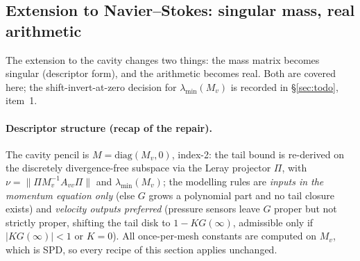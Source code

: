 \documentclass[11pt,a4paper]{article}
\begin{document}
{\subsection{Extension to Navier--Stokes: singular mass, real arithmetic}
\label{sec:ns}


The extension to the cavity changes two things: the mass matrix becomes singular
(descriptor form), and the arithmetic becomes real.  Both are covered here; the
shift-invert-at-zero decision for $\lambda_{\min}(M_v)$ is recorded in \S\ref{sec:todo},
item~1.

\paragraph{Descriptor structure (recap of the repair).}  The cavity pencil is
$M=\mathrm{diag}(M_v,0)$, index-2: the tail bound is re-derived on the discretely
divergence-free subspace via the Leray projector $\Pi$, with
$\nu=\|\Pi M_v^{-1}A_{vv}\Pi\|$ and $\lambda_{\min}(M_v)$; the modelling rules are
\emph{inputs in the momentum equation only} (else $G$ grows a polynomial part and no
tail closure exists) and \emph{velocity outputs preferred} (pressure sensors leave $G$
proper but not strictly proper, shifting the tail disk to $1-KG(\infty)$, admissible only
if $|KG(\infty)|<1$ or $K=0$).  All once-per-mesh constants are computed on $M_v$, which
is SPD, so every recipe of this section applies unchanged.

}
\end{document}
